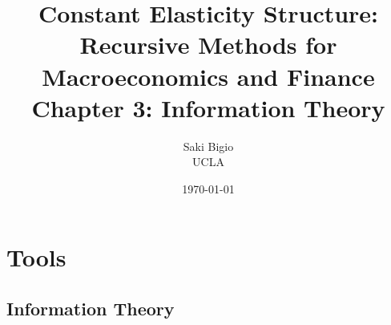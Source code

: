 \documentclass[12pt,openany]{book}
\title{Constant Elasticity Structure: \\ Recursive Methods for Macroeconomics and Finance \\ Chapter 3: Information Theory}
\author{Saki Bigio \\UCLA}
\date{\today}
\begin{document}
\frontmatter
\maketitle

\tableofcontents

\mainmatter

\part{Tools}
\label{part:tools}

\setcounter{chapter}{2}

\chapter{Information Theory}
\label{ch:information}



\backmatter


\end{document}
